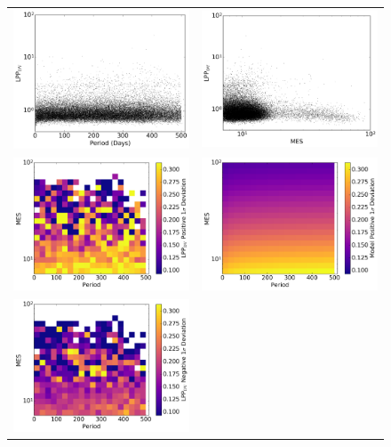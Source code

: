 \begin{figure}[hbtp]
\centering
\begin{tabular}{cc}
\includegraphics[width=0.5\linewidth]{ScoreFig-1.png} &
\includegraphics[width=0.5\linewidth]{ScoreFig-2.png} \\
\includegraphics[width=0.5\linewidth]{ScoreFig-3.png} &
\includegraphics[width=0.5\linewidth]{ScoreFig-4.png} \\
\includegraphics[width=0.5\linewidth]{ScoreFig-5.png} &

\end{tabular}
\end{figure}
